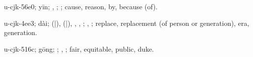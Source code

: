 \begin{multicols}{2}
{\cjkgGlue{}u-cjk-56e0; yīn; \cjkgGlue{}\cjkgGlue{}\cjkgGlue{}, \cjkgGlue{}\cjkgGlue{}\cjkgGlue{}; \cjkgGlue{}; cause, reason, by, because (of).

\cjkgGlue{}u-cjk-4ee3; dài; \cjkgGlue{}\cjkgGlue{}(\cjkgGlue{}|\cjkgGlue{}), \cjkgGlue{}\cjkgGlue{}(\cjkgGlue{}|\cjkgGlue{}), \cjkgGlue{}\cjkgGlue{}\cjkgGlue{}, \cjkgGlue{}, \cjkgGlue{}; \cjkgGlue{}, \cjkgGlue{}; replace, replacement (of person or generation), era, generation.

\cjkgGlue{}u-cjk-516c; gōng; \cjkgGlue{}; \cjkgGlue{}, \cjkgGlue{}; fair, equitable, public, duke.

}
\end{multicols}
